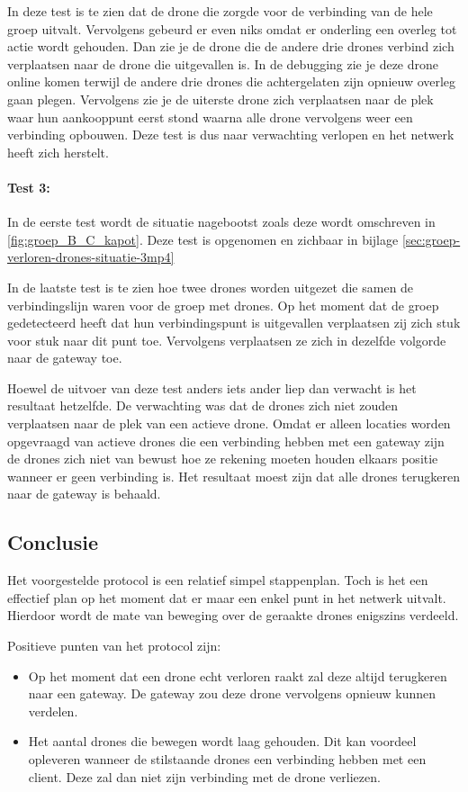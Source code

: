 \documentclass[a4paper, 11pt, oneside]{report}
\begin{document}
In deze test is te zien dat de drone die zorgde voor de verbinding van de hele groep uitvalt. Vervolgens gebeurd er even niks omdat er onderling een overleg tot actie wordt gehouden. Dan zie je de drone die de andere drie drones verbind zich verplaatsen naar de drone die uitgevallen is.
In de debugging zie je deze drone online komen terwijl de andere drie drones die achtergelaten zijn opnieuw overleg gaan plegen. 
Vervolgens zie je de uiterste drone zich verplaatsen naar de plek waar hun aankooppunt eerst stond waarna alle drone vervolgens weer een verbinding opbouwen. Deze test is dus naar verwachting verlopen en het netwerk heeft zich herstelt.

\paragraph{Test 3:} In de eerste test wordt de situatie nagebootst zoals deze wordt omschreven in \autoref{fig:groep_B_C_kapot}.
Deze test is opgenomen en zichbaar in bijlage \ref{sec:groep-verloren-drones-situatie-3mp4}

In de laatste test is te zien hoe twee drones worden uitgezet die samen de verbindingslijn waren voor de groep met drones.
Op het moment dat de groep gedetecteerd heeft dat hun verbindingspunt is uitgevallen verplaatsen zij zich stuk voor stuk naar dit punt toe.
Vervolgens verplaatsen ze zich in dezelfde volgorde naar de gateway toe.

Hoewel de uitvoer van deze test anders iets ander liep dan verwacht is het resultaat hetzelfde.
De verwachting was dat de drones zich niet zouden verplaatsen naar de plek van een actieve drone.
Omdat er alleen locaties worden opgevraagd van actieve drones die een verbinding hebben met een gateway zijn de drones zich niet van bewust hoe ze rekening moeten houden elkaars positie wanneer er geen verbinding is.
Het resultaat moest zijn dat alle drones terugkeren naar de gateway is behaald.

\subsection{Conclusie}

Het voorgestelde protocol is een relatief simpel stappenplan. 
Toch is het een effectief plan op het moment dat er maar een enkel punt in het netwerk uitvalt. 
Hierdoor wordt de mate van beweging over de geraakte drones enigszins verdeeld.

Positieve punten van het protocol zijn:
\begin{itemize}
	\item Op het moment dat een drone echt verloren raakt zal deze altijd terugkeren naar een gateway. De gateway zou deze drone vervolgens opnieuw kunnen verdelen.
	\item Het aantal drones die bewegen wordt laag gehouden. Dit kan voordeel opleveren wanneer de stilstaande drones een verbinding hebben met een client. Deze zal dan niet zijn verbinding met de drone verliezen.
\end{itemize}
\end{document}
